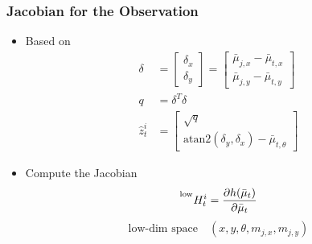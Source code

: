 \begin{frame}
    \frametitle{Jacobian for the Observation}

    \begin{itemize}
        \item Based on
        \begin{align*}
            \delta &= 
            \begin{bmatrix}
                \delta_x \\
                \delta_y
            \end{bmatrix}
            = \begin{bmatrix}
                \bar{\mu}_{j,x} - \bar{\mu}_{t,x} \\
                \bar{\mu}_{j,y} - \bar{\mu}_{t,y}
            \end{bmatrix}\\
            q &= \delta^T \delta\\
            \hat{z}^i_t &= 
            \begin{bmatrix}
                \sqrt{q} \\
                \text{atan2}(\delta_y, \delta_x) - \bar{\mu}_{t,\theta}
            \end{bmatrix}
        \end{align*}    
        \item Compute the Jacobian
        \begin{equation*}
            \prescript{\text{low}}{}{H^{i}_{t}} = \frac{\partial h(\bar{\mu}_t)}{\partial \bar{\mu}_t}
        \end{equation*}
        \begin{equation*}
            \text{low-dim space} \quad (x, y, \theta, m_{j,x}, m_{j,y})
        \end{equation*}
    \end{itemize}
\end{frame}


